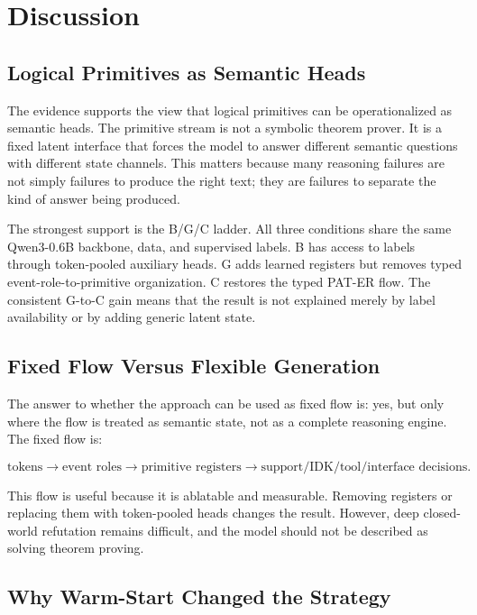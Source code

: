 \section{Discussion}
\label{sec:discussion}

\subsection{Logical Primitives as Semantic Heads}

The evidence supports the view that logical primitives can be operationalized as
semantic heads. The primitive stream is not a symbolic theorem prover. It is a
fixed latent interface that forces the model to answer different semantic
questions with different state channels. This matters because many reasoning
failures are not simply failures to produce the right text; they are failures to
separate the kind of answer being produced.

The strongest support is the B/G/C ladder. All three conditions share the same
Qwen3-0.6B backbone, data, and supervised labels. B has access to labels through
token-pooled auxiliary heads. G adds learned registers but removes typed
event-role-to-primitive organization. C restores the typed PAT-ER flow. The
consistent G-to-C gain means that the result is not explained merely by label
availability or by adding generic latent state.

\subsection{Fixed Flow Versus Flexible Generation}

The answer to whether the approach can be used as fixed flow is: yes, but only
where the flow is treated as semantic state, not as a complete reasoning engine.
The fixed flow is:

\begin{equation}
\text{tokens}
\rightarrow
\text{event roles}
\rightarrow
\text{primitive registers}
\rightarrow
\text{support/IDK/tool/interface decisions}.
\label{eq:semantic_flow}
\end{equation}

This flow is useful because it is ablatable and measurable. Removing registers
or replacing them with token-pooled heads changes the result. However, deep
closed-world refutation remains difficult, and the model should not be described
as solving theorem proving.

\subsection{Why Warm-Start Changed the Strategy}

